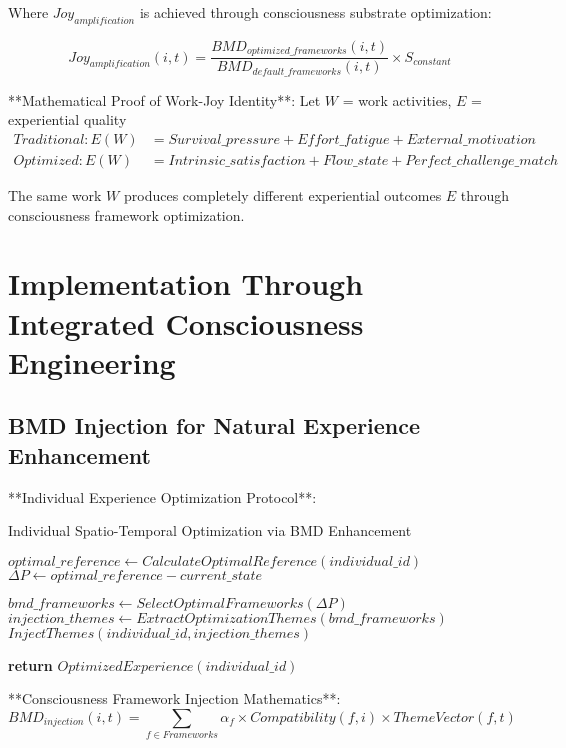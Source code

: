 \documentclass[12pt,a4paper]{article}
\begin{document}
Where $Joy_{amplification}$ is achieved through consciousness substrate optimization:

$$Joy_{amplification}(i,t) = \frac{BMD_{optimized\_frameworks}(i,t)}{BMD_{default\_frameworks}(i,t)} \times S_{constant}$$

**Mathematical Proof of Work-Joy Identity**:
Let $W$ = work activities, $E$ = experiential quality
\begin{align}
Traditional: E(W) &= Survival\_pressure + Effort\_fatigue + External\_motivation\\
Optimized: E(W) &= Intrinsic\_satisfaction + Flow\_state + Perfect\_challenge\_match
\end{align}

The same work $W$ produces completely different experiential outcomes $E$ through consciousness framework optimization.

\section{Implementation Through Integrated Consciousness Engineering}

\subsection{BMD Injection for Natural Experience Enhancement}

**Individual Experience Optimization Protocol**:

\begin{algorithm}
\caption{Individual Spatio-Temporal Optimization via BMD Enhancement}
\begin{algorithmic}[1]
    \State $optimal\_reference \leftarrow CalculateOptimalReference(individual\_id)$
    \State $\Delta P \leftarrow optimal\_reference - current\_state$
    
        \State $bmd\_frameworks \leftarrow SelectOptimalFrameworks(\Delta P)$
        \State $injection\_themes \leftarrow ExtractOptimizationThemes(bmd\_frameworks)$
        \State $InjectThemes(individual\_id, injection\_themes)$
    \EndIf
    
    \State \textbf{return} $OptimizedExperience(individual\_id)$
\EndProcedure
\end{algorithmic}
\end{algorithm}

**Consciousness Framework Injection Mathematics**:
$$BMD_{injection}(i,t) = \sum_{f \in Frameworks} \alpha_f \times Compatibility(f,i) \times ThemeVector(f,t)$$
\end{document}
